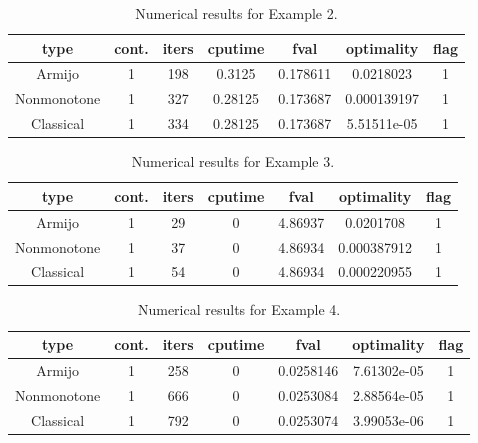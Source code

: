 \documentclass[a4paper]{article}
\begin{document}
  
  \begin{table}[p]
    \centering
    \begin{tabular}{cc|ccccc}
      \hline
      type & cont. & iters & cputime & 
      fval & optimality & flag \\ \hline
      Armijo & 1 & 198 & 0.3125 & 0.178611 & 0.0218023 & 1 \\
      Nonmonotone & 1 & 327 & 0.28125 & 0.173687 & 0.000139197 & 1 \\
      Classical & 1 & 334 & 0.28125 & 0.173687 & 5.51511e-05 & 1 \\
      \hline
    \end{tabular}
    \caption{Numerical results for Example 2.}
    \label{tab2}
  \end{table}
  

  
  
  \begin{table}[p]
    \centering
    \begin{tabular}{cc|ccccc}
      \hline
      type & cont. & iters & cputime & 
      fval & optimality & flag \\ \hline
      Armijo & 1 & 29 & 0 & 4.86937 & 0.0201708 & 1 \\
      Nonmonotone & 1 & 37 & 0 & 4.86934 & 0.000387912 & 1 \\
      Classical & 1 & 54 & 0 & 4.86934 & 0.000220955 & 1 \\
      \hline
    \end{tabular}
    \caption{Numerical results for Example 3.}
    \label{tab3}
  \end{table}
  

  
  \begin{table}[p]
    \centering
    \begin{tabular}{cc|ccccc}
      \hline
      type & cont. & iters & cputime & 
      fval & optimality & flag \\ \hline
      Armijo & 1 & 258 & 0 & 0.0258146 & 7.61302e-05 & 1 \\
      Nonmonotone & 1 & 666 & 0 & 0.0253084 & 2.88564e-05 & 1 \\
      Classical & 1 & 792 & 0 & 0.0253074 & 3.99053e-06 & 1 \\
      \hline
    \end{tabular}
    \caption{Numerical results for Example 4.}
    \label{tab4}
  \end{table}
  
  
  
\end{document}

